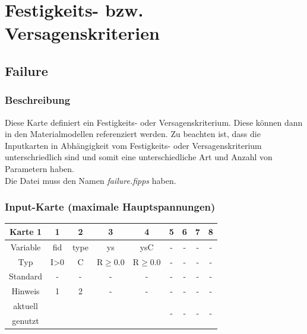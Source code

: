 \documentclass[11pt,titlepage,listof=totoc,bibliography=totoc,twoside]{scrreprt}
\begin{document}
{{\newpage

\section{Festigkeits- bzw. Versagenskriterien}

\subsection{Failure}

\subsubsection{Beschreibung}

Diese Karte definiert ein Festigkeits- oder Versagenskriterium. Diese können dann in den Materialmodellen referenziert werden. Zu beachten ist, dass die Inputkarten in Abhängigkeit vom Festigkeits- oder Versagenskriterium unterschriedlich sind und somit eine unterschiedliche Art und Anzahl von Parametern haben. \\
Die Datei muss den Namen \emph{failure.fipps} haben.

\subsubsection{Input-Karte (maximale Hauptspannungen)}

\begin{table}[htbp]
\centering
\begin{tabularx}{\textwidth}{cCCCcCCCC}
\toprule
Karte 1	& 1		& 2		& 3		& 4			& 5		& 6		& 7		& 8	\\
\midrule
Variable& fid		& type		& ys		& ysC			& -		& -		& -		& -	\\
Typ	& I>0		& C		& R$\ge$0.0	& R$\ge$0.0		& -		& -		& -		& -	\\
Standard& -		& -		& -		& -			& -		& -		& -		& -	\\
Hinweis	& 1		& 2		& -		& -			& -		& -		& -		& -	\\
aktuell	& 	& 	& 	& 	& 	& \multirow{2}{*}{-}	& 	& 	\\
genutzt \\
\bottomrule
\end{tabularx}
\end{table}

}}
\end{document}
